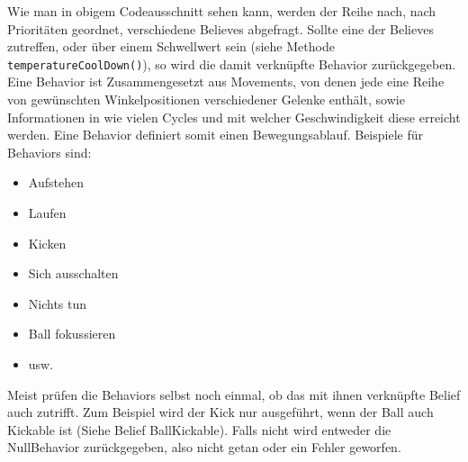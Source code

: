 \documentclass[fontsize=12pt,a4paper,final]{scrartcl}[2003/01/01]
\begin{document}
Wie man in obigem Codeausschnitt sehen kann, werden der Reihe nach, nach Prioritäten geordnet, verschiedene Believes abgefragt. Sollte eine der Believes zutreffen, oder über einem Schwellwert sein (siehe Methode \texttt{temperatureCoolDown()}), so wird die damit verknüpfte Behavior zurückgegeben. Eine Behavior ist Zusammengesetzt aus Movements, von denen jede eine Reihe von gewünschten Winkelpositionen verschiedener Gelenke enthält, sowie Informationen in wie vielen Cycles und mit welcher Geschwindigkeit diese erreicht werden. Eine Behavior definiert somit einen Bewegungsablauf.
Beispiele für Behaviors sind:
\begin{itemize}
\item Aufstehen
\item Laufen
\item Kicken
\item Sich ausschalten
\item Nichts tun
\item Ball fokussieren
\item usw.
\end{itemize}

Meist prüfen die Behaviors selbst noch einmal, ob das mit ihnen verknüpfte Belief auch zutrifft. Zum Beispiel wird der Kick nur ausgeführt, wenn der Ball auch Kickable ist (Siehe Belief BallKickable). Falls nicht wird entweder die NullBehavior zurückgegeben, also nicht getan oder ein Fehler geworfen.
\end{document}
